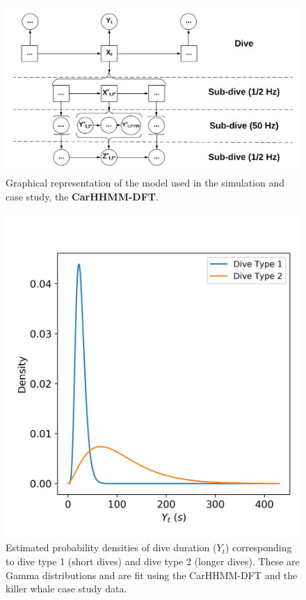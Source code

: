 
\begin{figure}[ht]
	\centering
	\includegraphics[width=5in]{../Plots/CarHHMM-DFT.png}
	\caption{Graphical representation of the model used in the simulation and case study, the \textbf{CarHHMM-DFT}.}
	\label{fig:CarHHMM-DFT}
\end{figure}

\begin{figure}[ht]
	\centering
	\includegraphics[width=5in]{../Plots/CarHHMM2-coarse-emissions.png}
	\caption{Estimated probability densities of dive duration ($Y_t$) corresponding to dive type 1 (short dives) and dive type 2 (longer dives). These are Gamma distributions and are fit using the CarHHMM-DFT and the killer whale case study data.}
	\label{fig:coarse_emis}
\end{figure}

